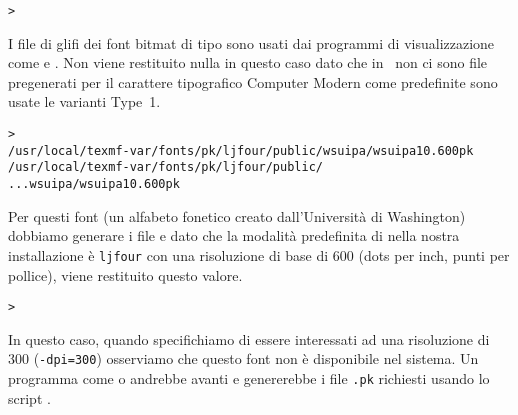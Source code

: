 \documentclass{article}
\begin{document}
\begin{alltt}
> 
\end{alltt}
I file di glifi dei font bitmat di tipo  sono usati dai
programmi di visualizzazione come  e . Non
viene restituito nulla in questo caso dato che in \TL\ non ci sono file
 pregenerati per il carattere tipografico Computer Modern \Dash
come predefinite sono usate le varianti Type~1.
\begin{alltt}
> 
\ifSingleColumn   /usr/local/texmf-var/fonts/pk/ljfour/public/wsuipa/wsuipa10.600pk
\else /usr/local/texmf-var/fonts/pk/ljfour/public/
...                         wsuipa/wsuipa10.600pk
\fi\end{alltt}
Per questi font (un alfabeto fonetico creato dall'Università di
Washington) dobbiamo generare i file  e dato che la modalità
predefinita di \MF{} nella nostra installazione è \texttt{ljfour} con una
risoluzione di base di 600\dpi{} (dots per inch, punti per pollice), viene
restituito questo valore.
\begin{alltt}
> 
\end{alltt}
In questo caso, quando specifichiamo di essere interessati ad una
risoluzione di 300\dpi{} (\texttt{-dpi=300}) osserviamo che questo font
non è disponibile nel sistema. Un programma come  o
 andrebbe avanti e genererebbe i file \texttt{.pk} richiesti
usando lo script .
\end{document}
